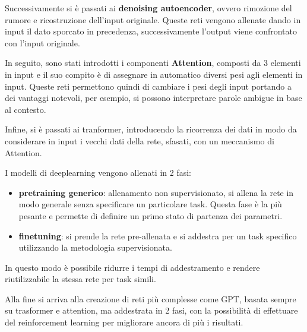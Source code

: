 Successivamente si è passati ai \textbf{denoising autoencoder}, ovvero rimozione
del rumore e ricostruzione dell'input originale. Queste reti vengono allenate dando
in input il dato sporcato in precedenza, successivamente l'output viene confrontato
con l'input originale.

In seguito, sono stati introdotti i componenti \textbf{Attention}, composti da 3
elementi in input e il suo compito è di assegnare in automatico diversi pesi
agli elementi in input. Queste reti permettono quindi di cambiare i pesi degli input
portando a dei vantaggi notevoli, per esempio, si possono interpretare parole ambigue
in base al contesto.

Infine, si è passati ai tranformer, introducendo la ricorrenza dei dati in modo da
considerare in input i vecchi dati della rete, sfasati, con un meccanismo di
Attention.

I modelli di deeplearning vengono allenati in 2 fasi:
\begin{itemize}
      \item \textbf{pretraining generico}: allenamento non supervisionato, si allena
            la rete in modo generale senza specificare un particolare task. Questa
            fase è la più pesante e permette di definire un primo stato di partenza
            dei parametri.
      \item \textbf{finetuning}: si prende la rete pre-allenata e si addestra per un
            task specifico utilizzando la metodologia supervisionata.
\end{itemize}
In questo modo è possibile ridurre i tempi di addestramento e rendere riutilizzabile
la stessa rete per task simili.

Alla fine si arriva alla creazione di reti più complesse come GPT, basata sempre
su trasformer e attention, ma addestrata in 2 fasi, con la possibilità di effettuare
del reinforcement learning per migliorare ancora di più i risultati.